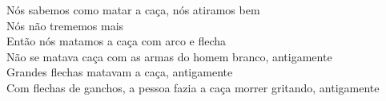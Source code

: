 \begin{linenumbers}\begingroup\raggedright
 
\noindent Nós sabemos como matar a caça, nós atiramos bem\\
 Nós não trememos mais\\
 Então nós matamos a caça com arco e flecha\\
 Não se matava caça com as armas do homem branco, antigamente\\
 Grandes flechas matavam a caça, antigamente\\
 Com flechas de ganchos, a pessoa fazia a caça morrer gritando, antigamente
 
\end{linenumbers}\endgroup

\bigskip

